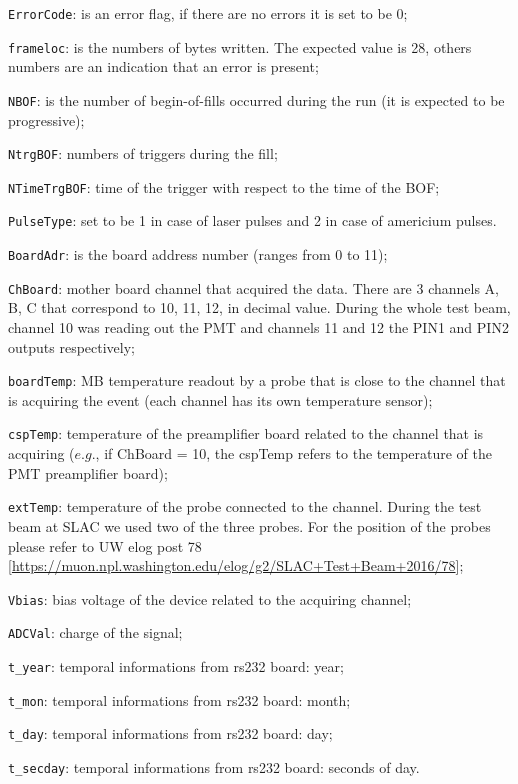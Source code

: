 \begin{description}
  \item \verb+ErrorCode+: is an error flag, if there are no errors it is set to be 0;
  \item \verb+frameloc+: is the numbers of bytes written. The expected value is 28, others numbers are an indication that an error is present;
  \item \verb+NBOF+: is the number of begin-of-fills occurred during the run (it is expected to be progressive);
\item \verb+NtrgBOF+: numbers of triggers during the fill;
 \item \verb+NTimeTrgBOF+: time of the trigger with respect to the time of the BOF;
\item	 \verb+PulseType+: set to be 1 in case of laser pulses and 2 in case of  americium pulses. 
\item \verb+BoardAdr+:  is the board address number (ranges from 0 to 11);
\item \verb+ChBoard+: mother board channel that acquired the data. There are 3 channels A, B, C  that correspond to 10, 11, 12, in decimal value. During the whole test beam, channel 10 was reading out the PMT and channels 11 and 12 the PIN1 and PIN2 outputs respectively;
\item \verb+boardTemp+: MB temperature readout by a probe that is close to the channel that is acquiring the event (each channel has its own temperature sensor);
\item \verb+cspTemp+: temperature of the preamplifier board related to the channel that is acquiring ($e.g.$, if ChBoard = 10, the cspTemp refers to the temperature of the PMT preamplifier board);
\item \verb+extTemp+: temperature of the probe connected to the channel. During the test beam at SLAC we used two of the three probes. For the position of the probes please refer to  UW elog post 78 [\url{https://muon.npl.washington.edu/elog/g2/SLAC+Test+Beam+2016/78}];
\item \verb+Vbias+: bias voltage of the device related to the acquiring channel;
\item \verb+ADCVal+: charge of the signal;
\item \verb+t_year+: temporal informations from rs232 board: year;
\item \verb+t_mon+: temporal informations from rs232 board: month;
\item \verb+t_day+: temporal informations from rs232 board: day;
\item \verb+t_secday+: temporal informations from rs232 board: seconds of day.
\end{description}

